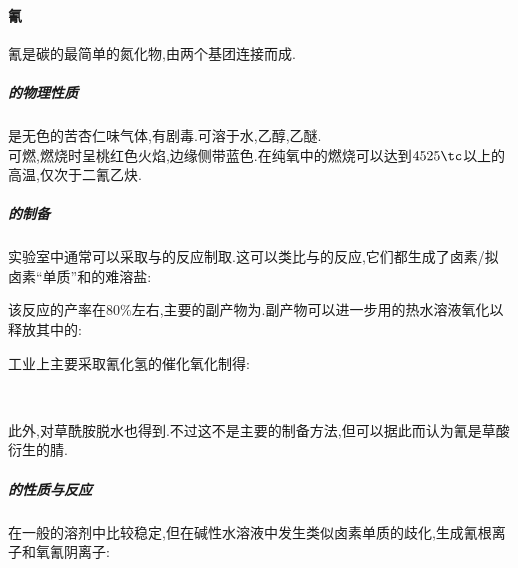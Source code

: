 \documentclass[draft]{ctexart}
\begin{document}
\paragraph{氰}
氰是碳的最简单的氮化物,由两个基团连接而成.
\subparagraph{的物理性质}
是无色的苦杏仁味气体,有剧毒.可溶于水,乙醇,乙醚.\\
\indent {}可燃,燃烧时呈桃红色火焰,边缘侧带蓝色.在纯氧中的燃烧可以达到$4525\tc$以上的高温,仅次于二氰乙炔.
\subparagraph{的制备}
实验室中通常可以采取与的反应制取.这可以类比与的反应,它们都生成了卤素/拟卤素“单质”和的难溶盐:
\begin{center}
\end{center}
该反应的产率在$80\%$左右,主要的副产物为.副产物可以进一步用的热水溶液氧化以释放其中的:
\begin{center}
\end{center}

\indent 工业上主要采取氰化氢的催化氧化制得:
\begin{center}
    \\
\end{center}

\indent 此外,对草酰胺脱水也得到.不过这不是主要的制备方法,但可以据此而认为氰是草酸衍生的腈.
\begin{center}
\end{center}
\subparagraph{的性质与反应}
在一般的溶剂中比较稳定,但在碱性水溶液中发生类似卤素单质的歧化,生成氰根离子和氧氰阴离子:
\begin{center}
\end{center}
\end{document}
